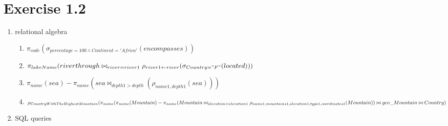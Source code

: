 \documentclass[12pt]{article}
\begin{document}
	\section{Exercise 1.2}
	
	\begin{enumerate}
		\item relational algebra
			\begin{enumerate}[label=(\alph*)]
				\item $\pi_{code}(\sigma_{percentage=100\land Continent='Africa'}(encompasses))$
				\item $\pi_{lakeName}( riverthrough \bowtie_{river=river1} \rho_{river1\leftarrow river}(\sigma_{Country="F"}(located)))$
				\item $\pi_{name}(sea)  - \pi_{name}(sea \bowtie_{depth1 > depth}(\rho_{name1,depth1}(sea)))$
				\item $\rho_{CountryWithTheHighestMountain}(\pi_{name}\\
							(\pi_{name}(Mountain) - \pi_{name}( Mountain \bowtie_{elevation<elevation1}\\ \rho_{name1,mountains1,elevation1,type1,coordinates1}(Mountain))\\
							\bowtie geo\_Mountain \bowtie Country
							)$
			\end{enumerate}
		\item SQL queries
			
	\end{enumerate}
\end{document}
